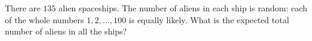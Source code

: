 There are $135$ alien spaceships. The number of aliens in each ship is random: each of the whole numbers $1,2,\dots,100$ is equally likely. What is the expected total number of aliens in all the ships?
